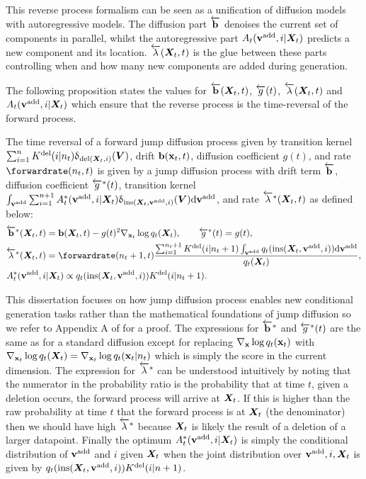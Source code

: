 This reverse process formalism can be seen as a unification of diffusion models with autoregressive models. The diffusion part $\overleftarrow{\mathbf{b}}$ denoises the current set of components in parallel, whilst the autoregressive part $A_t({\mathbf{v}}^{\textup{add}}, i | {\bm{X}}_t)$ predicts a new component and its location. $\overleftarrow{\lambda}({\bm{X}}_t, t)$ is the glue between these parts controlling when and how many new components are added during generation.

The following proposition states the values for $\overleftarrow{\mathbf{b}}({\bm{X}}_t, t)$, $\overleftarrow{g}(t)$, $\overleftarrow{\lambda}({\bm{X}}_t, t)$ and $A_t({\mathbf{v}}^{\textup{add}}, i | {\bm{X}}_t)$ which ensure that the reverse process is the time-reversal of the forward process.
\begin{proposition}
\label{prop:time_reversal}
The time reversal of a forward jump diffusion process given by transition kernel $\sum_{i=1}^n K^{\textup{del}}(i | n_t) \updelta_{\textup{del}({\bm{X}}_t, i)}({\bm{V}})$, drift ${\mathbf{b}}({\mathbf{x}}_t, t)$, diffusion coefficient $g(t)$, and rate $\forwardrate(n_t, t)$ is given by a jump diffusion process with drift term $\overleftarrow{\mathbf{b}}$, diffusion coefficient $\overleftarrow{g}^*(t)$, transition kernel $\int_{{\mathbf{v}}^{\textup{add}}} \sum_{i=1}^{n+1}  A^*_t({\mathbf{v}}^{\textup{add}}, i | {\bm{X}}_t) \updelta_{\textup{ins}({\bm{X}}_t, {\mathbf{v}}^{\textup{add}}, i)}({\bm{V}}) \mathrm{d} {\mathbf{v}}^{\textup{add}}$, and rate $\overleftarrow{\lambda}^*({\bm{X}}_t, t)$ as defined below:
\begin{align}
    &\backwarddrift^*(\mX_t, t) = \rvb(\mX_t, t) - g(t)^2 \nabla_{\rvx_t} \log q_t(\mX_t), \qquad \backwarddiffcoeff^*(t) = g(t),\\
    & \backwardrate^*(\mX_t, t) = \forwardrate(n_t+1, t) \frac{ \sum_{i=1}^{n_t+1} \delidxdist(i | n_t+1) \int_{\yadd} q_t(\textup{ins}(\mX_t, \yadd, i)) \rmd \yadd }{q_t(\mX_t)},\\
    & \autonet_{t}^*( \yadd, i | \mX_t) \propto q_{t}(\textup{ins}(\mX_t, \yadd, i) ) \delidxdist(i| n_t+1).
\end{align}
\end{proposition}
This dissertation focuses on how jump diffusion process enables new conditional generation tasks rather than the mathematical foundations of jump diffusion so we refer to Appendix A of \citet{campbell2024trans} for a proof. The expressions for $\overleftarrow{\mathbf{b}}^*$ and $\overleftarrow{g}^*(t)$ are the same as for a standard diffusion except for replacing $\nabla_{{\mathbf{x}}} \log q_t({\mathbf{x}}_t)$ with $\nabla_{{\mathbf{x}}_t} \log q_t({\bm{X}}_t) = \nabla_{{\mathbf{x}}_t} \log q_t({\mathbf{x}}_t | n_t)$ which is simply the score in the current dimension.
The expression for $\overleftarrow{\lambda}^*$ can be understood intuitively by noting that the numerator in the probability ratio is the probability that at time $t$, given a deletion occurs, the forward process will arrive at ${\bm{X}}_t$. If this is higher than the raw probability at time $t$ that the forward process is at ${\bm{X}}_t$ (the denominator) then we should have high $\overleftarrow{\lambda}^*$ because ${\bm{X}}_t$ is likely the result of a deletion of a larger datapoint.
Finally the optimum $A^*_t({\mathbf{v}}^{\textup{add}}, i | {\bm{X}}_t)$ is simply the conditional distribution of ${\mathbf{v}}^{\textup{add}}$ and $i$ given ${\bm{X}}_t$ when the joint distribution over ${\mathbf{v}}^{\textup{add}}, i, {\bm{X}}_t$ is given by $q_{t}(\text{ins}({\bm{X}}_t, {\mathbf{v}}^{\textup{add}}, i) ) K^{\textup{del}}(i| n+1)$. 

